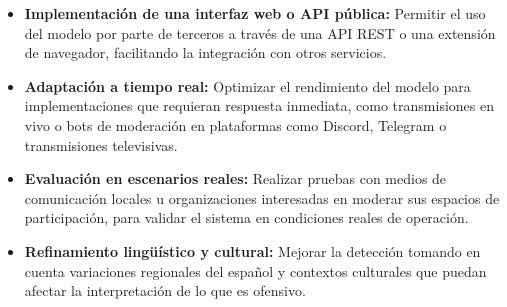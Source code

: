 
\vspace{0.5cm}

\begin{itemize}
    \item \textbf{Implementación de una interfaz web o API pública:} Permitir el uso del modelo por parte de terceros a través de una API REST o una extensión de navegador, facilitando la integración con otros servicios.

    \item \textbf{Adaptación a tiempo real:} Optimizar el rendimiento del modelo para implementaciones que requieran respuesta inmediata, como transmisiones en vivo o bots de moderación en plataformas como Discord, Telegram o transmisiones televisivas.

    \item \textbf{Evaluación en escenarios reales:} Realizar pruebas con medios de comunicación locales u organizaciones interesadas en moderar sus espacios de participación, para validar el sistema en condiciones reales de operación.

    \item \textbf{Refinamiento lingüístico y cultural:} Mejorar la detección tomando en cuenta variaciones regionales del español y contextos culturales que puedan afectar la interpretación de lo que es ofensivo.
\end{itemize}


